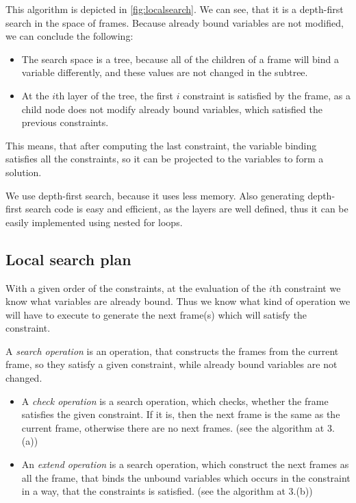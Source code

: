This algorithm is depicted in \autoref{fig:localsearch}. 
We can see, that it is a depth-first search in the space of frames. 
Because already bound variables are not modified, we can conclude the following:
\begin{itemize}
	\item 
	The search space is a tree, because all of the children of a frame will bind a variable differently, and these values are not changed in the subtree.
	\item
	At the $i$th layer of the tree, the first $i$ constraint is satisfied by the frame, as a child node does not modify already bound variables, which satisfied the previous constraints.
		
\end{itemize}

This means, that after computing the last constraint, the variable binding satisfies all the constraints, so it can be projected to the variables to form a solution.

We use depth-first search, because it uses less memory. Also generating depth-first search code is easy and efficient, as the layers are well defined, thus it can be easily implemented using nested for loops.

\subsection{Local search plan}
With a given order of the constraints, at the evaluation of the $i$th constraint we know what variables are already bound. Thus we know what kind of operation we will have to execute to generate the next frame(s) which will satisfy the constraint.

A \emph{search operation} is an operation, that constructs the frames from the current frame, so they satisfy a given constraint, while already bound variables are not changed.
\begin{itemize}
	\item 
	A \emph{check operation} is a search operation, which checks, whether the frame satisfies the given constraint. If it is, then the next frame is the same as the current frame, otherwise there are no next frames. (see the algorithm at 3.(a))
	\item
	An \emph{extend operation} is a search operation, which construct the next frames as all the frame, that binds the unbound variables which occurs in the constraint in a way, that the constraints is satisfied. (see the algorithm at 3.(b))

\end{itemize}

